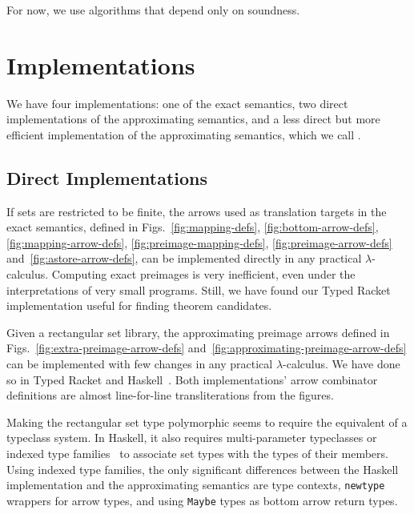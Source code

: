 \documentclass{llncs}
\newcommand{\figsref}[1]{Figs.~\ref{#1}}
\begin{document}
For now, we use algorithms that depend only on soundness.


\section{Implementations}
\label{sec:implementation}

We have four implementations: one of the exact semantics, two direct implementations of the approximating semantics, and a less direct but more efficient implementation of the approximating semantics, which we call .

\subsection{Direct Implementations}

If sets are restricted to be finite, the arrows used as translation targets in the exact semantics, defined in \figsref{fig:mapping-defs}, \ref{fig:bottom-arrow-defs}, \ref{fig:mapping-arrow-defs}, \ref{fig:preimage-mapping-defs}, \ref{fig:preimage-arrow-defs} and~\ref{fig:astore-arrow-defs}, can be implemented directly in any practical $\lambda$-calculus.
Computing exact preimages is very inefficient, even under the interpretations of very small programs.
Still, we have found our Typed Racket~\cite{cit:tobin-hochstadt-2008popl-typed-scheme} implementation useful for finding theorem candidates.

Given a rectangular set library, the approximating preimage arrows defined in \figsref{fig:extra-preimage-arrow-defs} and~\ref{fig:approximating-preimage-arrow-defs} can be implemented with few changes in any practical $\lambda$-calculus.
We have done so in Typed Racket and Haskell~\cite{cit:haskell-lang}.
Both implementations' arrow combinator definitions are almost line-for-line transliterations from the figures.

Making the rectangular set type polymorphic seems to require the equivalent of a typeclass system.
In Haskell, it also requires multi-parameter typeclasses or indexed type families~\cite{cit:chakravarty-2005popl-type-families} to associate set types with the types of their members.
Using indexed type families, the only significant differences between the Haskell implementation and the approximating semantics are type contexts, \texttt{newtype} wrappers for arrow types, and using \texttt{Maybe} types as bottom arrow return types.
\end{document}
